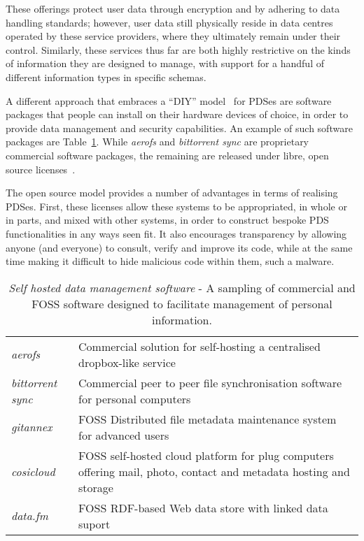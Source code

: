\documentclass[graybox]{svmult}
\begin{document}
These offerings protect user data through encryption and by adhering to data handling standards; however, user data still physically reside in data centres operated by these service providers, where they ultimately remain under their control.  Similarly, these services thus far are both highly restrictive on the kinds of information they are designed to manage, with support for a handful of different information types in specific schemas.

A different approach that embraces a ``DIY” model~\cite{purdue1997diy} for PDSes are software packages that people can install on their hardware devices of choice, in order to provide data management and security capabilities.  An example of such software packages are Table~\ref{fig:selfhosted}.   While \emph{aerofs} and \emph{bittorrent sync} are proprietary commercial software packages, the remaining are released under libre, open source licenses~\cite{von2001learning}. 

The open source model provides a number of advantages in terms of realising PDSes.  First, these licenses allow these systems to be appropriated,  in whole or in parts, and mixed with other systems, in order to construct bespoke PDS functionalities in any ways seen fit.  It also encourages transparency by allowing anyone (and everyone) to consult, verify and improve its code, while at the same time making it difficult to hide malicious code within them, such a malware.  

\begin{table}
\begin{tabular}{l p{9cm}}
\emph{aerofs} & Commercial solution for self-hosting a centralised dropbox-like service \\
\emph{bittorrent sync} & Commercial peer to peer file synchronisation software for personal computers \\
\emph{gitannex} &  FOSS Distributed file metadata maintenance system for advanced users \\ 
\emph{cosicloud} & FOSS self-hosted cloud platform for plug computers offering mail, photo, contact and metadata hosting and storage \\
\emph{data.fm} & FOSS RDF-based Web data store with linked data suport
\end{tabular}
\caption{\emph{Self hosted data management software} - A sampling of commercial and FOSS software designed to facilitate management of personal information. }
\label{fig:selfhosted}
\end{table}
\end{document}
